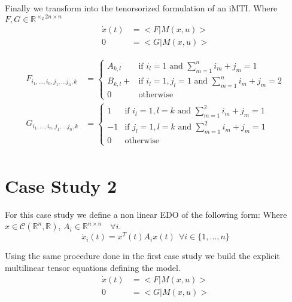 \documentclass{article}
\begin{document}
Finally we transform into the tenorsorized formulation of an iMTI.
Where $F, G \in \mathbb{R}^{\times_2 2n \times n}$
\begin{align}
    \dot{x}(t) &= <F|M(x,u)> \\
    0 &= <G|M(x,u)>
\end{align}


\begin{align}
    F_{i_1, ..., i_n, j_1, ...j_n, k} &= \left\{
        \begin{array}{ll}
            A_{k,l} & \text{if } i_l = 1 \text{ and } \sum_{m= 1}^n i_m + j_m = 1 \\
            B_{k,l} +  & \text{if } i_l = 1, j_l = 1 \text{ and } \sum_{m= 1}^n i_m + j_m = 2 \\
            0 & \text{otherwise} 
        \end{array}
    \right.\\
    G_{i_1, ..., i_n, j_1, ...j_n, k} &= \left\{
        \begin{array}{ll}
            1 & \text{if } i_l = 1, l=k \text{ and } \sum_{m= 1}^2 i_m + j_m = 1 \\
            -1 & \text{if } j_l = 1, l=k \text{ and } \sum_{m= 1}^2 i_m + j_m = 1 \\
            0 & \text{otherwise} 
        \end{array}
    \right.\\
\end{align}

\section{Case Study 2}

For this case study we define a non linear EDO of the following form:
Where $x \in \mathcal{C}(\mathbb{R}^n, \mathbb{R})$, $A_i \in \mathbb{R}^{n \times n } \quad \forall i$.
\begin{equation}
    \dot{x}_i(t) = x^T(t) A_i x(t) \ \ \forall i \in \{1,...,n\} 
\end{equation}

Using the same procedure done in the first case study we build the explicit multilinear tensor equations defining the model.
\begin{align}
    \dot{x}(t) &= <F|M(x,u)> \\
    0 &= <G|M(x,u)>
\end{align}
\end{document}

